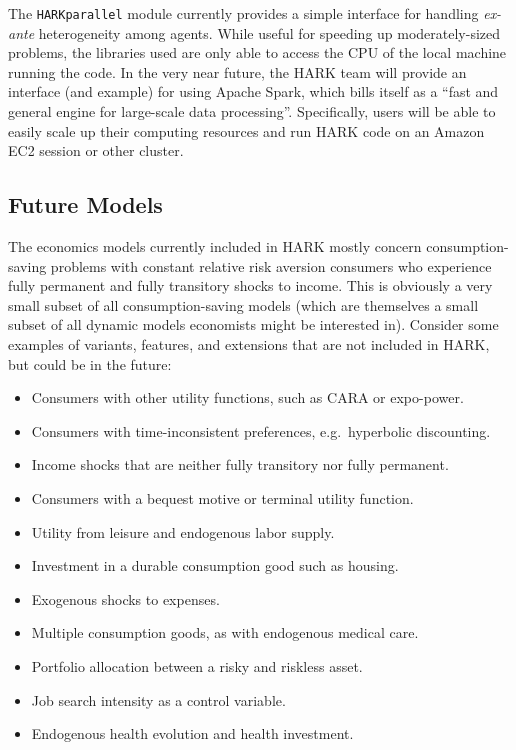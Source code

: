 \documentclass[12pt,titlepage,letterpaper]{econtex}
\begin{document}
The \texttt{HARKparallel} module currently provides a simple interface for handling \textit{ex-ante} heterogeneity among agents.  While useful for speeding up moderately-sized problems, the libraries used are only able to access the CPU of the local machine running the code.  In the very near future, the HARK team will provide an interface (and example) for using Apache Spark, which bills itself as a ``fast and general engine for large-scale data processing''.  Specifically, users will be able to easily scale up their computing resources and run HARK code on an Amazon EC2 session or other cluster.

\subsection{Future Models}\label{sec:FutureModels}

The economics models currently included in HARK mostly concern consumption-saving problems with constant relative risk aversion consumers who experience fully permanent and fully transitory shocks to income.  This is obviously a very small subset of all consumption-saving models (which are themselves a small subset of all dynamic models economists might be interested in).  Consider some examples of variants, features, and extensions that are not included in HARK, but could be in the future:
\begin{itemize}
\item Consumers with other utility functions, such as CARA or expo-power.

\item Consumers with time-inconsistent preferences, e.g.\ hyperbolic discounting.

\item Income shocks that are neither fully transitory nor fully permanent.

\item Consumers with a bequest motive or terminal utility function.

\item Utility from leisure and endogenous labor supply.

\item Investment in a durable consumption good such as housing.

\item Exogenous shocks to expenses.

\item Multiple consumption goods, as with endogenous medical care.

\item Portfolio allocation between a risky and riskless asset.

\item Job search intensity as a control variable.

\item Endogenous health evolution and health investment.
\end{itemize}
\end{document}
